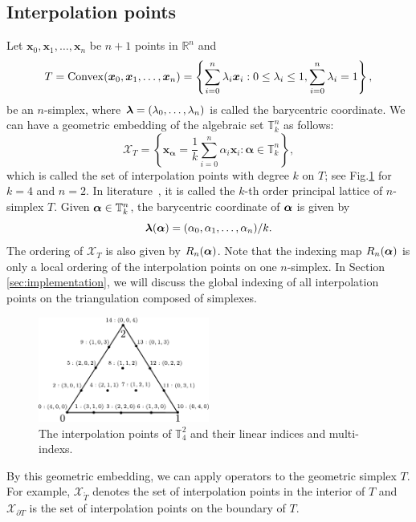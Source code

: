 \documentclass[mathpazo]{cicp}
\begin{document}
\subsection{Interpolation points}
Let $\boldsymbol x_0, \boldsymbol x_1, \ldots, \boldsymbol x_n$ be $n+1$ points in $\mathbb R^n$ and 
$$T = {\rm Convex}(\boldsymbol x_0, \boldsymbol x_1, \ldots, \boldsymbol x_n) =\left \{ \sum_{i=0}^n \lambda_i \boldsymbol x_i : 0\leq \lambda_i \leq 1, \sum_{i=0}^n\lambda_i = 1 \right \},$$ 
be an $n$-simplex, where $\boldsymbol \lambda=(\lambda_0, \ldots, \lambda_n)$ is called the barycentric coordinate. We can have a geometric embedding of the algebraic set $\mathbb T^n_k$ as follows:
$$
\mathcal X_{T} = \left \{\boldsymbol
x_{\boldsymbol \alpha} = \frac{1}{k}\sum_{i = 0}^n \alpha_i \boldsymbol
x_i: \boldsymbol \alpha\in \mathbb T^n_k \right \},
$$
which is called the set of interpolation points with degree $k$ on $T$; see Fig.\ref{fig:interpointk4} for $k=4$ and $n=2$. In literature~\cite{nicolaides1972class}, it is called the $k$-th order principal lattice of $n$-simplex $T$. Given $\boldsymbol \alpha\in \mathbb T^{n}_k$, the barycentric coordinate of $\boldsymbol \alpha$ is given by
$$
\boldsymbol \lambda(\boldsymbol \alpha) = (\alpha_0, \alpha_1, \ldots, \alpha_n )/k.
$$ The ordering of $\mathcal X_T$ is also given by $R_n(\boldsymbol\alpha)$.  Note
that the indexing map $R_n(\boldsymbol\alpha)$ is only a local ordering of the
interpolation points on one $n$-simplex. In Section \ref{sec:implementation}, we will discuss the global
indexing of all interpolation points on the triangulation composed of simplexes.


\begin{figure}[htp]
\centering
\includegraphics[width=0.5\textwidth]{figures/tridof-4.pdf}
\caption{The interpolation points of $\mathbb T^2_4$ and their
linear indices and multi-indexs. }
\label{fig:interpointk4}
\end{figure}

By this geometric embedding, we can apply operators to the geometric simplex $T$. For example, $\mathcal X_{\mathring{T}}$ denotes the set of interpolation points in the interior of $T$ and $\mathcal X_{\partial T}$ is the set of interpolation points on the boundary of $T$. 
\end{document}
